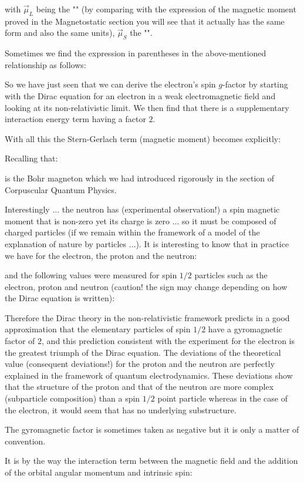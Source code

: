 	with $\vec{\mu}_L$ being the "" (by comparing with the expression of the magnetic moment proved in the Magnetostatic section you will see that it actually has the same form and also the same units), $\vec{\mu}_S$ the "".

	Sometimes we find the expression in parentheses in the above-mentioned relationship as follows:
	
	So we have just seen that we can derive the electron's spin $g$-factor by starting with the Dirac equation for an electron in a weak electromagnetic field and looking at its non-relativistic limit. We then find that there is a supplementary interaction energy term having a factor $2$.

	With all this the Stern-Gerlach term (magnetic moment) becomes explicitly:
	
	Recalling that:
	
	is the Bohr magneton which we had introduced rigorously in the section of Corpuscular Quantum Physics.
	
	Interestingly ... the neutron has (experimental observation!) a spin magnetic moment that is non-zero yet its charge is zero ... so it must be composed of charged particles (if we remain within the framework of a model of the explanation of nature by particles ...). It is interesting to know that in practice we have for the electron, the proton and the neutron:
	
	and the following values were measured for spin $1/2$ particles such as the electron, proton and neutron (caution! the sign may change depending on how the Dirac equation is written):
	
	Therefore the Dirac theory in the non-relativistic framework predicts in a good approximation that the elementary particles of spin $1/2$ have a gyromagnetic factor of $2$, and this prediction consistent with the experiment for the electron is the greatest triumph of the Dirac equation. The deviations of the theoretical value (consequent deviations!) for the proton and the neutron are perfectly explained in the framework of quantum electrodynamics. These deviations show that the structure of the proton and that of the neutron are more complex (subparticle composition) than a spin $1/2$ point particle whereas in the case of the electron, it would seem that has no underlying substructure.
	\begin{tcolorbox}[title=Remark,colframe=black,arc=10pt]
	The gyromagnetic factor is sometimes taken as negative but it is only a matter of convention.
	\end{tcolorbox}
	It is by the way the interaction term between the magnetic field and the addition of the orbital angular momentum and intrinsic spin:
	
